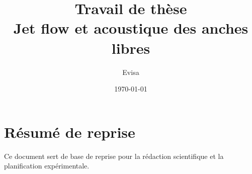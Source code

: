 \documentclass[12pt,a4paper]{report}
\title{Travail de thèse\\Jet flow et acoustique des anches libres}
\author{Evisa}
\date{\today}
\begin{document}
\maketitle
\tableofcontents

\chapter*{Résumé de reprise}
Ce document sert de base de reprise pour la rédaction scientifique et la planification expérimentale.









\end{document}
